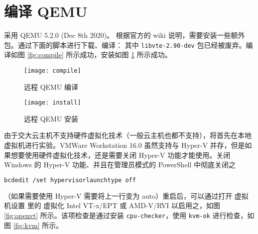 



    \section{编译 QEMU}
    采用 QEMU 5.2.0 (Dec 8th 2020)。
    根据官方的 wiki 说明\cite{installwiki}，需要安装一些额外包。通过下面的脚本进行下载、编译：
    其中 \verb"libvte-2.90-dev" 包已经被废弃。编译如图 \ref{fig:compile} 所示成功，安装如图 \ref{fig:install} 所示成功。
    \begin{figure}[h]
        \centering
        \begin{minipage}{0.48\textwidth}
            \centering
            \texttt{[image: compile]}
            \caption{远程 QEMU 编译}\label{fig:compile}
        \end{minipage}
        \begin{minipage}{0.48\textwidth}
            \texttt{[image: install]}
            \caption{远程 QEMU 安装}\label{fig:install}
        \end{minipage}
    \end{figure}


    由于交大云主机不支持硬件虚拟化技术（一般云主机也都不支持），将首先在本地虚拟机进行实验。VMWare Workstation 16.0 虽然支持与 Hyper-V 并存，但是如果想要使用硬件虚拟化技术，还是需要关闭 Hyper-V 功能才能使用。关闭 Windows 的 Hyper-V 功能、并且在管理员模式的 PowerShell 中彻底关闭之
\begin{lstlisting}[style=commandshell,language=bash]
bcdedit /set hypervisorlaunchtype off
\end{lstlisting}
    （如果需要使用 Hyper-V 需要将上一行变为 auto）重启后，可以通过打开 \textsf{虚拟机设置} 里的 \textsf{虚拟化 Intel VT-x/EPT 或 AMD-V/RVI} 以启用之，如图 \ref{fig:openvt} 所示。该项检查是通过安装 \verb"cpu-checker"，使用 \verb"kvm-ok" 进行检查，如图 \ref{fig:kvm} 所示。

